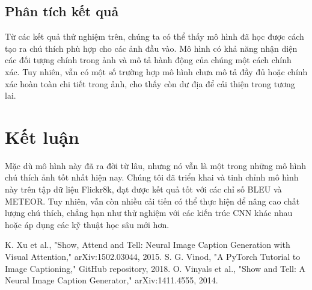 \documentclass[conference]{IEEEtran}
\begin{document}
\subsection{Phân tích kết quả}
Từ các kết quả thử nghiệm trên, chúng ta có thể thấy mô hình đã học được cách tạo ra chú thích phù hợp cho các ảnh đầu vào. Mô hình có khả năng nhận diện các đối tượng chính trong ảnh và mô tả hành động của chúng một cách chính xác. Tuy nhiên, vẫn có một số trường hợp mô hình chưa mô tả đầy đủ hoặc chính xác hoàn toàn chi tiết trong ảnh, cho thấy còn dư địa để cải thiện trong tương lai.
\section{Kết luận}
Mặc dù mô hình này đã ra đời từ lâu, nhưng nó vẫn là một trong những mô hình chú thích ảnh tốt nhất hiện nay. Chúng tôi đã triển khai và tinh chỉnh mô hình này trên tập dữ liệu Flickr8k, đạt được kết quả tốt với các chỉ số BLEU và METEOR. Tuy nhiên, vẫn còn nhiều cải tiến có thể thực hiện để nâng cao chất lượng chú thích, chẳng hạn như thử nghiệm với các kiến trúc CNN khác nhau hoặc áp dụng các kỹ thuật học sâu mới hơn.
\begin{thebibliography}{00}
 K. Xu et al., "Show, Attend and Tell: Neural Image Caption Generation with Visual Attention," arXiv:1502.03044, 2015.
 S. G. Vinod, "A PyTorch Tutorial to Image Captioning," GitHub repository, 2018.
 O. Vinyals et al., "Show and Tell: A Neural Image Caption Generator," arXiv:1411.4555, 2014.
\end{thebibliography}
\vspace{12pt}
\color{red}
\end{document}
